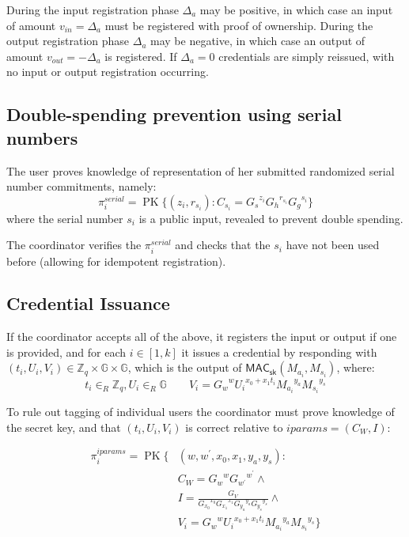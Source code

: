 \documentclass{article}
\begin{document}
During the input registration phase $\Delta_{a}$ may be positive, in which case an input of amount $v_{\mathit{in}} = \Delta_{a}$ must be registered with proof of ownership. During the output registration phase $\Delta_{a}$ may be negative, in which case an output of amount $v_{\mathit{out}} = -\Delta_{a}$ is registered. If $\Delta_{a} = 0$ credentials are simply reissued, with no input or output registration occurring.

\subsection{Double-spending prevention using serial numbers}

The user proves knowledge of representation of her submitted randomized serial number commitments, namely:
\[ \pi_{i}^{\mathit{serial}}=\operatorname{PK}\{ (z_i, r_{s_i}): C_{s_i} = {G_s}^{z_i}{G_h}^{r_{s_i}}{G_g}^{s_i} \} \]
where the serial number $s_i$ is a public input, revealed to prevent double spending.

The coordinator verifies the $\pi_{i}^{\mathit{serial}}$ and checks that the $s_i$ have not been used before (allowing for idempotent registration).

\subsection{Credential Issuance}

If the coordinator accepts all of the above, it registers the input or output if one is provided, and for each $i \in [1,k]$ it issues a credential by responding with
$(t_i, U_i, V_i) \in \mathbb{Z}_q \times \mathbb{G} \times \mathbb{G}$,
which is the output of
$\mathsf{MAC}_{\mathsf{sk}}(M_{a_i}, M_{s_i})$,
where:
\[
t_i \in_{R} \mathbb{Z}_{q}, U_i \in_{R} \mathbb{G}
\qquad
V_i={G_w}^{w} {U_i}^{x_{0}+x_{1} t_i}{M_{a_i}}^{y_a} {M_{s_i}}^{y_s}
\]

To rule out tagging of individual users the coordinator must prove knowledge of the secret key, and that $(t_i, U_i, V_i)$ is correct relative to $\mathit{iparams}=(C_{W}, I)$:

\begin{align*}
\pi_{i}^{\mathit{iparams}}=\operatorname{PK}\{ & (w, w^{\prime}, x_{0}, x_{1}, y_a, y_s): \\
&C_{W}={G_{w}}^{w} {G_{w^{\prime}}}^{w^\prime} \land \\
&I=\frac{G_{V}}{{G_{x_{0}}}^{x_0} {G_{x_1}}^{x_1} {G_{y_a}}^{y_a} {G_{y_s}}^{y_s}} \land \\
&V_i={G_w}^{w}{U_i}^{x_{0}+x_{1}t_i} {M_{a_i}}^{y_a} {M_{s_i}}^{y_s}
\}
\end{align*}
\end{document}
